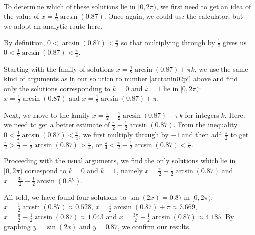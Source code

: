 \documentclass{ximera}
\begin{document}
\begin{example}
\begin{explanation}
\begin{enumerate}
\[\begin{array}{rclr}
\end{array}\] 



To determine which of these solutions lie in $[0,2\pi)$, we first need to get an idea of the value of $x=\frac{1}{2} \arcsin(0.87)$.  Once again, we could use the calculator, but we adopt an analytic route here.  

By definition, $0 < \arcsin(0.87) < \frac{\pi}{2}$ so that multiplying through by $\frac{1}{2}$ gives us $0 < \frac{1}{2} \arcsin(0.87) < \frac{\pi}{4}$.  

Starting with the family of solutions $x = \frac{1}{2} \arcsin(0.87) + \pi k$, we use the same kind of arguments as in our solution to number \ref{arctanin02pi} above and find only the solutions corresponding to $k =0$ and $k=1$ lie in $[0,2\pi)$:  $x = \frac{1}{2} \arcsin(0.87)$ and $x = \frac{1}{2} \arcsin(0.87) + \pi$. 

 Next, we move to the family $x =\frac{\pi}{2} -  \frac{1}{2}\arcsin(0.87) + \pi k$ for integers $k$. Here, we need to get a better estimate of $\frac{\pi}{2} - \frac{1}{2} \arcsin(0.87)$.  From the inequality $0 < \frac{1}{2}\arcsin(0.87) < \frac{\pi}{4}$, we first multiply through by $-1$ and then add $\frac{\pi}{2}$ to get $\frac{\pi}{2} > \frac{\pi}{2} -\frac{1}{2} \arcsin(0.87) >  \frac{\pi}{4}$, or $\frac{\pi}{4} < \frac{\pi}{2} -\frac{1}{2} \arcsin(0.87) < \frac{\pi}{2}$.  
  
 Proceeding with the usual arguments, we find the only solutions which lie in $[0,2\pi)$ correspond to $k = 0$ and $k=1$, namely $x =\frac{\pi}{2} -  \frac{1}{2}\arcsin(0.87)$ and  $x = \frac{3\pi}{2} - \frac{1}{2}\arcsin(0.87)$. 
  
All told, we have found four solutions to $\sin(2x) = 0.87$ in $[0,2\pi)$:  $x =\frac{1}{2} \arcsin(0.87) \approx 0.528$, $x=\frac{1}{2} \arcsin(0.87) + \pi \approx 3.669$, $x =\frac{\pi}{2} -  \frac{1}{2}\arcsin(0.87) \approx 1.043$ and  $x = \frac{3\pi}{2} - \frac{1}{2}\arcsin(0.87) \approx 4.185$. By graphing $y = \sin(2x)$ and $y = 0.87$, we confirm our results.

\begin{center}
\end{center} 

\end{enumerate}
\end{explanation}
\end{example}
\end{document}
